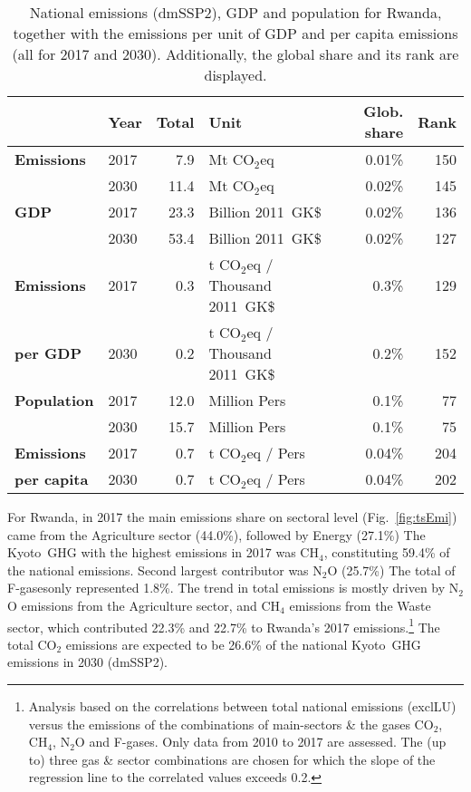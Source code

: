 \documentclass[12pt]{article}
\begin{document}
 \begin{table}[H]
 \centering
 \caption{National emissions (dmSSP2), GDP and population for Rwanda, together with the emissions per unit of GDP and per capita emissions (all for 2017 and 2030). 
 Additionally, the global share and its rank are displayed.}
 \label{tab:overview}
 \begin{tabular}{l || l r l r r}
 \bfseries  & \bfseries Year & \bfseries Total & \bfseries Unit & \bfseries Glob. share & \bfseries Rank \tabularnewline \hline \hline
 \bfseries Emissions & 2017 & 7.9 & Mt CO$_2$eq & 0.01\% & 150 \tabularnewline 
 \bfseries  & 2030 & 11.4 & Mt CO$_2$eq & 0.02\% & 145 \tabularnewline \hline
 \bfseries GDP & 2017 & 23.3 & Billion 2011~GK\$ & 0.02\% & 136 \tabularnewline 
 \bfseries  & 2030 & 53.4 & Billion 2011~GK\$ & 0.02\% & 127 \tabularnewline \hline
 \bfseries Emissions & 2017 & 0.3 & t CO$_2$eq / Thousand 2011~GK\$ & 0.3\% & 129 \tabularnewline 
 \bfseries per GDP & 2030 & 0.2 & t CO$_2$eq / Thousand 2011~GK\$ & 0.2\% & 152 \tabularnewline \hline
 \bfseries Population & 2017 & 12.0 & Million Pers & 0.1\% & 77 \tabularnewline 
 \bfseries  & 2030 & 15.7 & Million Pers & 0.1\% & 75 \tabularnewline \hline
 \bfseries Emissions & 2017 & 0.7 & t CO$_2$eq /  Pers & 0.04\% & 204 \tabularnewline 
 \bfseries per capita & 2030 & 0.7 & t CO$_2$eq /  Pers & 0.04\% & 202 \tabularnewline 
 \end{tabular}
 \end{table}

 For Rwanda, in 2017 the main emissions share on sectoral level (Fig.~\ref{fig:tsEmi}) came from the Agriculture sector (44.0\%), followed by Energy (27.1\%)
 The Kyoto~GHG with the highest emissions in 2017 was CH$_4$, constituting  59.4\% of the national emissions. 
 Second largest contributor was N$_2$O (25.7\%)
 The total of F-gasesonly represented 1.8\%.
 The trend in total emissions is mostly driven by N$_2$O emissions from the Agriculture sector, and CH$_4$ emissions from the Waste sector, which contributed 22.3\% and 22.7\% to Rwanda's 2017 emissions.\footnote{Analysis based on the correlations between total national emissions (exclLU) versus the emissions of the combinations of main-sectors \& the gases CO$_2$, CH$_4$, N$_2$O and F-gases. 
 Only data from 2010 to 2017 are assessed. 
 The (up to) three gas \& sector combinations are chosen for which the slope of the regression line to the correlated values exceeds 0.2.}
 The total CO$_2$ emissions are expected to be 26.6\% of the national Kyoto~GHG emissions in 2030 (dmSSP2).
\end{document}
